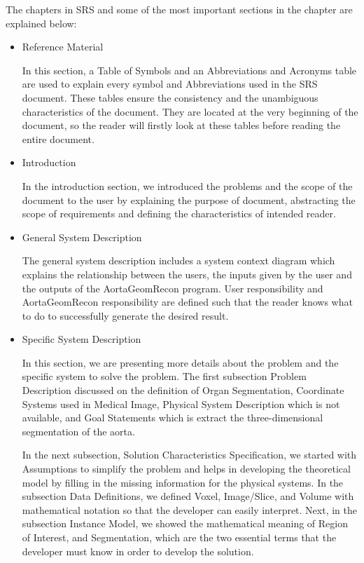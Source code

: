 The chapters in SRS and some of the most important sections in the chapter are explained below:
\begin{itemize}
\item Reference Material

In this section, a Table of Symbols and an Abbreviations and Acronyms table are used to explain every symbol and Abbreviations used in the SRS document. These tables ensure the consistency and the unambiguous characteristics of the document. They are located at the very beginning of the document, so the reader will firstly look at these tables before reading the entire document.

\item Introduction

In the introduction section, we introduced the problems and the scope of the document to the user by explaining the purpose of document, abstracting the scope of requirements and defining the characteristics of intended reader. 

\item General System Description

The general system description includes a system context diagram which explains the relationship between the users, the inputs given by the user and the outputs of the AortaGeomRecon program. User responsibility and AortaGeomRecon responsibility are defined such that the reader knows what to do to successfully generate the desired result. 

\item Specific System Description

In this section, we are presenting more details about the problem and the specific system to solve the problem. The first subsection Problem Description discussed on the definition of Organ Segmentation, Coordinate Systems used in Medical Image, Physical System Description which is not available, and Goal Statements which is extract the three-dimensional segmentation of the aorta.

In the next subsection, Solution Characteristics Specification, we started with Assumptions to simplify the problem and helps in developing the theoretical model by filling in the missing information for the physical systems. In the subsection Data Definitions, we defined Voxel, Image/Slice, and Volume with mathematical notation so that the developer can easily interpret. Next, in the subsection Instance Model, we showed the mathematical meaning of Region of Interest, and Segmentation, which are the two essential terms that the developer must know in order to develop the solution.



\end{itemize}
